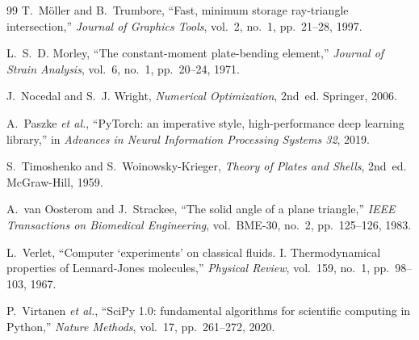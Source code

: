 \documentclass[11pt,a4paper]{article}
\theoremstyle{remark}
\begin{document}
\begin{thebibliography}{99}
T.~M{\"o}ller and B.~Trumbore, ``Fast, minimum storage ray-triangle intersection,''
\emph{Journal of Graphics Tools}, vol.~2, no.~1, pp.~21--28, 1997.

L.~S.~D. Morley, ``The constant-moment plate-bending element,''
\emph{Journal of Strain Analysis}, vol.~6, no.~1, pp.~20--24, 1971.

J.~Nocedal and S.~J. Wright, \emph{Numerical Optimization}, 2nd~ed. Springer, 2006.

A.~Paszke \emph{et al.}, ``PyTorch: an imperative style, high-performance deep learning library,''
in \emph{Advances in Neural Information Processing Systems 32}, 2019.

S.~Timoshenko and S.~Woinowsky-Krieger, \emph{Theory of Plates and Shells}, 2nd~ed. McGraw-Hill, 1959.

A.~van Oosterom and J.~Strackee, ``The solid angle of a plane triangle,''
\emph{IEEE Transactions on Biomedical Engineering}, vol.~BME-30, no.~2, pp.~125--126, 1983.

L.~Verlet, ``Computer `experiments' on classical fluids. I. Thermodynamical properties of Lennard-Jones molecules,''
\emph{Physical Review}, vol.~159, no.~1, pp.~98--103, 1967.

P.~Virtanen \emph{et al.}, ``SciPy 1.0: fundamental algorithms for scientific computing in Python,''
\emph{Nature Methods}, vol.~17, pp.~261--272, 2020.

\end{thebibliography}
\end{document}

